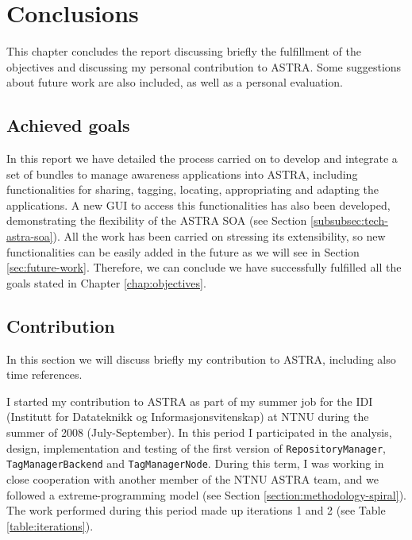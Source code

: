 \chapter{Conclusions}
\label{chap:conclusions}
This chapter concludes the report discussing briefly the fulfillment of the
objectives and discussing my personal contribution to ASTRA. Some
suggestions about future work are also included, as well as a personal evaluation.


\section{Achieved goals}
\label{sec:goals}

In this report we have detailed the process carried on to develop and integrate
a set of bundles to manage awareness applications into ASTRA, including
functionalities for sharing, tagging, locating, appropriating and adapting the
applications. A new GUI to access this functionalities has also been
developed, demonstrating the flexibility of the ASTRA SOA (see Section 
\ref{subsubsec:tech-astra-soa}). All the work has been carried on stressing its
extensibility, so new functionalities can be easily added in the future as we
will see in Section \ref{sec:future-work}. Therefore, we can conclude we have 
successfully fulfilled all the goals stated in Chapter \ref{chap:objectives}.

\section{Contribution}
\label{sec:contribution}
In this section we will discuss briefly my contribution to ASTRA, including
also time references.

I started my contribution to ASTRA as part of my summer job for the IDI
(Institutt for Datateknikk og Informasjonsvitenskap) at NTNU during
the summer of 2008 (July-September). In this period I participated in the
analysis, design, implementation and testing of the first version of 
\verb|RepositoryManager|, \verb|TagManagerBackend| and \verb|TagManagerNode|.
During this term, I was working in close cooperation with another member of the
NTNU ASTRA team, and we followed a extreme-programming model (see Section 
\ref{section:methodology-spiral}). The work performed during this period made 
up iterations 1 and 2 (see Table \ref{table:iterations}).

